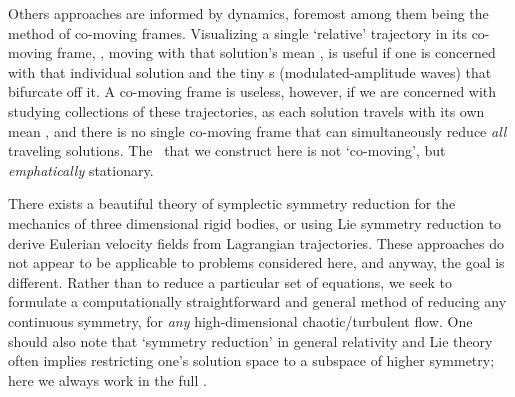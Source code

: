 \documentclass[aip,cha,reprint,
secnumarabic,
nofootinbib, tightenlines,
nobibnotes, showkeys, showpacs,
groupedaddress
]{revtex4-1}
\begin{document}
Others approaches are informed by dynamics, foremost among them being the
method of {co-moving frames}. Visualizing a single `relative' trajectory
in its co-moving frame, \ie, moving with that solution's mean
{\phaseVel}, is useful if one is concerned with that individual solution
and the tiny \rpo s (modulated-amplitude waves) that bifurcate off
it. A co-moving frame is useless, however, if
we are concerned with studying collections of these trajectories, as each
solution travels with its own mean {\phaseVel}, and there is no single
co-moving frame that can simultaneously reduce \emph{all} traveling
solutions. The \slice\ that we construct here is not `co-moving', but
\emph{emphatically} stationary.

There exists a beautiful theory of symplectic symmetry reduction for the
mechanics of three dimensional rigid bodies, or
using Lie symmetry reduction to derive Eulerian velocity fields from
Lagrangian trajectories. These approaches do not appear to
be applicable to problems considered here, and anyway, the goal is
different. Rather than to reduce a particular set of equations, we seek
to formulate a computationally straightforward and general method of
reducing any continuous symmetry, for \emph{any} high-dimensional
chaotic/turbulent flow. One should also note that `symmetry reduction'
in general relativity and Lie theory often implies
restricting one's solution space to a subspace of higher symmetry; here
we always work in the full \statesp.
\end{document}
